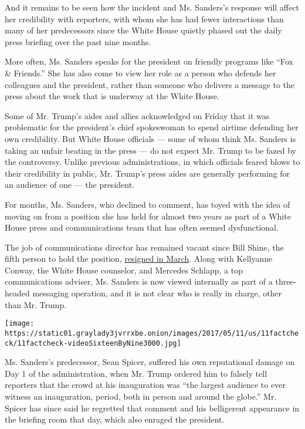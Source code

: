 And it remains to be seen how the incident and Ms. Sanders's response
will affect her credibility with reporters, with whom she has had fewer
interactions than many of her predecessors since the White House quietly
phased out the daily press briefing over the past nine months.

More often, Ms. Sanders speaks for the president on friendly programs
like ``Fox \& Friends.'' She has also come to view her role as a person
who defends her colleagues and the president, rather than someone who
delivers a message to the press about the work that is underway at the
White House.

Some of Mr. Trump's aides and allies acknowledged on Friday that it was
problematic for the president's chief spokeswoman to spend airtime
defending her own credibility. But White House officials --- some of
whom think Ms. Sanders is taking an unfair beating in the press --- do
not expect Mr. Trump to be fazed by the controversy. Unlike previous
administrations, in which officials feared blows to their credibility in
public, Mr. Trump's press aides are generally performing for an audience
of one --- the president.

For months, Ms. Sanders, who declined to comment, has toyed with the
idea of moving on from a position she has held for almost two years as
part of a White House press and communications team that has often
seemed dysfunctional.

The job of communications director has remained vacant since Bill Shine,
the fifth person to hold the position,
\href{https://www.nytimes3xbfgragh.onion/2019/03/08/us/politics/bill-shine-resigns.html}{resigned
in March}. Along with Kellyanne Conway, the White House counselor, and
Mercedes Schlapp, a top communications adviser, Ms. Sanders is now
viewed internally as part of a three-headed messaging operation, and it
is not clear who is really in charge, other than Mr. Trump.

\texttt{[image: https://static01.graylady3jvrrxbe.onion/images/2017/05/11/us/11factcheck/11factcheck-videoSixteenByNine3000.jpg]}

Ms. Sanders's predecessor, Sean Spicer, suffered his own reputational
damage on Day 1 of the administration, when Mr. Trump ordered him to
falsely tell reporters that the crowd at his inauguration was ``the
largest audience to ever witness an inauguration, period, both in person
and around the globe.'' Mr. Spicer has since said he regretted that
comment and his belligerent appearance in the briefing room that day,
which also enraged the president.

